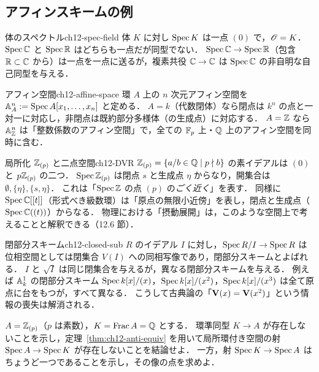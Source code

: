 \subsection{アフィンスキームの例}

\begin{myex}{体のスペクトル}{ch12-spec-field}
体 $K$ に対し $\operatorname{Spec} K$ は一点 $(0)$ で，$\mathscr{O}=K$．$\operatorname{Spec}\mathbb{C}$ と $\operatorname{Spec}\mathbb{R}$ はどちらも一点だが同型でない．
$\operatorname{Spec}\mathbb{C}\to\operatorname{Spec}\mathbb{R}$（包含 $\mathbb{R}\subset\mathbb{C}$ から）は一点を一点に送るが，複素共役 $\mathbb{C}\to\mathbb{C}$ は $\operatorname{Spec}\mathbb{C}$ の非自明な自己同型を与える．
\end{myex}

\begin{myex}{アフィン空間}{ch12-affine-space}
環 $A$ 上の $n$ 次元アフィン空間を $\mathbb{A}^n_A:=\operatorname{Spec} A[x_1,\dots,x_n]$ と定める．
$A=k$（代数閉体）なら閉点は $k^n$ の点と一対一に対応し，非閉点は既約部分多様体（の生成点）に対応する．
$A=\mathbb{Z}$ なら $\mathbb{A}^n_{\mathbb{Z}}$ は「整数係数のアフィン空間」で，全ての $\mathbb{F}_p$ 上・$\mathbb{Q}$ 上のアフィン空間を同時に含む．
\end{myex}

\begin{myex}{局所化 $\mathbb{Z}_{(p)}$ と二点空間}{ch12-DVR}
$\mathbb{Z}_{(p)}=\{a/b\in\mathbb{Q}\mid p\nmid b\}$ の素イデアルは $(0)$ と $p\mathbb{Z}_{(p)}$ の二つ．
$\operatorname{Spec}\mathbb{Z}_{(p)}$ は閉点 $s$ と生成点 $\eta$ からなり，開集合は $\emptyset,\{\eta\},\{s,\eta\}$．
これは「$\operatorname{Spec}\mathbb{Z}$ の点 $(p)$ の\emph{ごく近く}」を表す．
同様に $\operatorname{Spec}\mathbb{C}[[t]]$（形式べき級数環）は「原点の無限小近傍」を表し，閉点と生成点（$\operatorname{Spec}\mathbb{C}((t))$）からなる．
物理における「摂動展開」は，このような空間上で考えることと解釈できる（12.6 節）．
\end{myex}

\begin{myex}{閉部分スキーム}{ch12-closed-sub}
$R$ のイデアル $I$ に対し，$\operatorname{Spec} R/I\to\operatorname{Spec} R$ は位相空間としては閉集合 $V(I)$ への同相写像であり，閉部分スキームとよばれる．
$I$ と $\sqrt I$ は同じ閉集合を与えるが，異なる閉部分スキームを与える．
例えば $\mathbb{A}^1_k$ の閉部分スキーム $\operatorname{Spec} k[x]/(x)$，$\operatorname{Spec} k[x]/(x^2)$，$\operatorname{Spec} k[x]/(x^3)$ は全て原点に台をもつが，すべて異なる．
こうして古典論の「$\mathbf{V}(x)=\mathbf{V}(x^2)$」という情報の喪失は解消される．
\end{myex}

$A=\mathbb{Z}_{(p)}$（$p$ は素数），$K=\operatorname{Frac} A=\mathbb{Q}$ とする．
環準同型 $K\to A$ が存在しないことを示し，定理~\ref{thm:ch12-anti-equiv} を用いて局所環付き空間の射 $\operatorname{Spec} A\to\operatorname{Spec} K$ が存在しないことを結論せよ．
一方，射 $\operatorname{Spec} K\to\operatorname{Spec} A$ はちょうど一つであることを示し，その像の点を求めよ．

